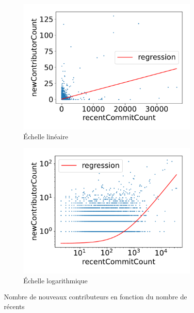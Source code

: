 \begin{figure}[ht]
    \centering
    \begin{subfigure}[t]{0.5\textwidth}
        \includegraphics[width=\textwidth]{experiment/data_analysis/recentCommitCountRegression_linearScale}
        \caption{Échelle linéaire}
    \end{subfigure}%
    \begin{subfigure}[t]{0.5\textwidth}
        \includegraphics[width=\textwidth]{experiment/data_analysis/recentCommitCountRegression_logScale}
        \caption{Échelle logarithmique}
    \end{subfigure}

    
    \caption{Nombre de nouveaux contributeurs en fonction du nombre de  récents}
    \label{fig:commitCount}
\end{figure}

